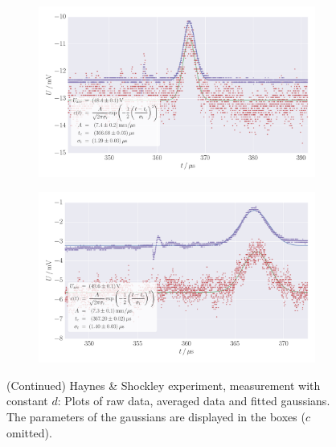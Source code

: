 \begin{figure}
    \centering
    \begin{subfigure}[b]{\pltw}
        \includegraphics[width=1.0\linewidth]{figures/haynes_shockley_raw_U_39}
        \caption{}
        \label{fig:h_s_raw_U_39}
    \end{subfigure}
    \begin{subfigure}[b]{\pltw}
        \includegraphics[width=1.0\linewidth]{figures/haynes_shockley_raw_U_65}
        \caption{}
        \label{fig:h_s_raw_U_65}
    \end{subfigure}
    \caption{
        (Continued)
        Haynes \& Shockley experiment, measurement with constant $d$:
        Plots of raw data, averaged data and fitted gaussians. 
        The parameters of the gaussians are displayed in the boxes 
        ($c$ omitted).
        }
    \label{fig:h_s_raw_plots_U_39_65}
\end{figure}

